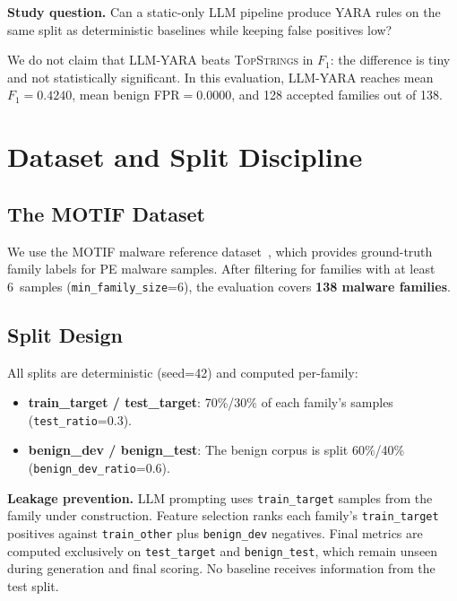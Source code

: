 \documentclass[10pt,twocolumn]{article}
\newcommand{\sysname}{\textsc{LLM-YARA}\xspace}
\newcommand{\topstrings}{\textsc{TopStrings}\xspace}
\newcommand{\motif}{\textsc{MOTIF}\xspace}
\begin{document}
\textbf{Study question.}  Can a static-only LLM pipeline produce YARA
rules on the same split as deterministic baselines while keeping false
positives low?

We do not claim that \sysname beats \topstrings in $F_1$: the
difference is tiny and not statistically significant.  In this
evaluation, \sysname reaches mean $F_1=0.4240$, mean benign
FPR$=0.0000$, and 128 accepted families out of 138.

\section{Dataset and Split Discipline}
\label{sec:dataset}

\subsection{The MOTIF Dataset}
We use the \motif malware reference dataset~\cite{joyce2022motif},
which provides ground-truth family labels for PE malware samples.
After filtering for families with at least 6~samples
(\texttt{min\_family\_size}=6), the evaluation covers \textbf{138
malware families}.

\subsection{Split Design}
All splits are deterministic (seed=42) and computed per-family:
\begin{itemize}[nosep,leftmargin=1.2em]
  \item \textbf{train\_target / test\_target}: 70\%/30\% of each
    family's samples (\texttt{test\_ratio}=0.3).
  \item \textbf{benign\_dev / benign\_test}: The benign corpus is
    split 60\%/40\% (\texttt{benign\_dev\_ratio}=0.6).
\end{itemize}

\textbf{Leakage prevention.}  LLM prompting uses
\texttt{train\_target} samples from the family under construction.
Feature selection ranks each family's \texttt{train\_target} positives
against \texttt{train\_other} plus \texttt{benign\_dev} negatives.
Final metrics are computed exclusively on \texttt{test\_target} and
\texttt{benign\_test}, which remain unseen during generation and final
scoring.  No baseline receives information from the test split.

\end{document}
